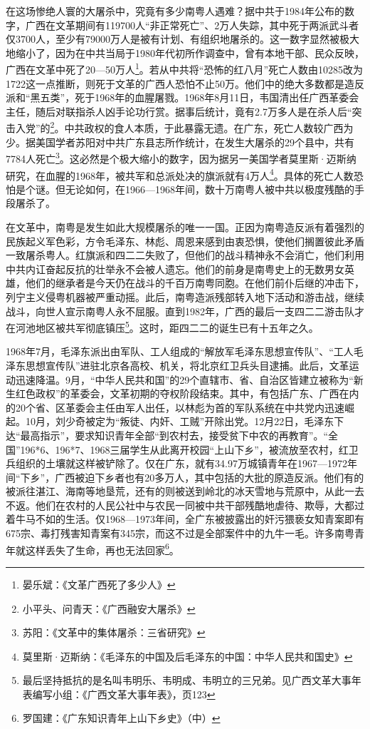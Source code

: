 在这场惨绝人寰的大屠杀中，究竟有多少南粤人遇难？据中共于1984年公布的数字，广西在文革期间有119700人“非正常死亡”、2万人失踪，其中死于两派武斗者仅3700人，至少有79000万人是被有计划、有组织地屠杀的。这一数字显然被极大地缩小了，因为在中共当局于1980年代初所作调查中，曾有本地干部、民众反映，广西在文革中死了20—50万人\footnote{晏乐斌：《文革广西死了多少人》}。若从中共将“恐怖的红八月”死亡人数由10285改为1722这一点推断，则死于文革的广西人恐怕不止50万。他们中的绝大多数都是造反派和“黑五类”，死于1968年的血腥屠戮。1968年8月11日，韦国清出任广西革委会主任，随后对联指杀人凶手论功行赏。据事后统计，竟有2.7万多人是在杀人后“突击入党”的\footnote{小平头、问青天：《广西融安大屠杀》}。中共政权的食人本质，于此暴露无遗。在广东，死亡人数较广西为少。据美国学者苏阳对中共广东县志所作统计，在发生大屠杀的29个县中，共有7784人死亡\footnote{苏阳：《文革中的集体屠杀：三省研究》}。这必然是个极大缩小的数字，因为据另一美国学者莫里斯·迈斯纳研究，在血腥的1968年，被共军和总派处决的旗派就有4万人\footnote{莫里斯·迈斯纳：《毛泽东的中国及后毛泽东的中国：中华人民共和国史》}。具体的死亡人数恐怕是个谜。但无论如何，在1966—1968年间，数十万南粤人被中共以极度残酷的手段屠杀了。

在文革中，南粤是发生如此大规模屠杀的唯一一国。正因为南粤造反派有着强烈的民族起义军色彩，方令毛泽东、林彪、周恩来感到由衷恐惧，使他们搁置彼此矛盾一致屠杀粤人。红旗派和四二二失败了，但他们的战斗精神永不会消亡，他们利用中共内讧奋起反抗的壮举永不会被人遗忘。他们的前身是南粤史上的无数男女英雄，他们的继承者是今天仍在战斗的千百万南粤同胞。在他们前仆后继的冲击下，列宁主义侵粤机器被严重动摇。此后，南粤造派残部转入地下活动和游击战，继续战斗，向世人宣示南粤人永不屈服。直到1982年，广西的最后一支四二二游击队才在河池地区被共军彻底镇压\footnote{最后坚持抵抗的是名叫韦明乐、韦明成、韦明立的三兄弟。见广西文革大事年表编写小组：《广西文革大事年表》，页123}。这时，距四二二的诞生已有十五年之久。

1968年7月，毛泽东派出由军队、工人组成的“解放军毛泽东思想宣传队”、“工人毛泽东思想宣传队”进驻北京各高校、机关，将北京红卫兵头目逮捕。此后，文革运动迅速降温。9月，“中华人民共和国”的29个直辖市、省、自治区皆建立被称为“新生红色政权”的革委会，文革初期的夺权阶段结束。其中，有包括广东、广西在内的20个省、区革委会主任由军人出任，以林彪为首的军队系统在中共党内迅速崛起。10月，刘少奇被定为“叛徒、内奸、工贼”开除出党。12月22日，毛泽东下达“最高指示”，要求知识青年全部“到农村去，接受贫下中农的再教育”。“全国”196*6、196*7、1968三届学生从此离开校园“上山下乡”，被流放至农村，红卫兵组织的土壤就这样被铲除了。仅在广东，就有34.97万城镇青年在1967—1972年间“下乡”，广西被迫下乡者也有20多万人，其中包括的大批的原造反派。他们有的被派往湛江、海南等地垦荒，还有的则被送到岭北的冰天雪地与荒原中，从此一去不返。他们在农村的人民公社中与农民一同被中共干部残酷地虐待、欺辱，大都过着牛马不如的生活。仅1968—1973年间，全广东被披露出的奸污猥亵女知青案即有675宗、毒打残害知青案有345宗，而这不过是全部案件中的九牛一毛。许多南粤青年就这样丢失了生命，再也无法回家\footnote{罗国建：《广东知识青年上山下乡史》（中）}。


